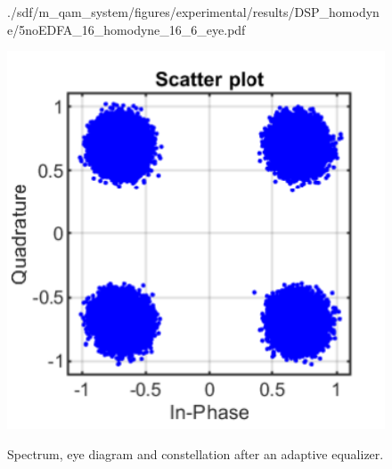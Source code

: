 \begin{figure}[H]
\begin{minipage}{0.30\textwidth}
			{./sdf/m_qam_system/figures/experimental/results/DSP_homodyne/5noEDFA_16_homodyne_16_6_eye.pdf}
			\label{fig:16GBdSpecMF}
		\end{minipage}
		\begin{minipage}{0.30\textwidth}
			\centering
			\includegraphics[width=1\textwidth]
			{./sdf/m_qam_system/figures/experimental/results/DSP_homodyne/5noEDFA_16_homodyne_16_6_const.pdf}\\
			\label{fig:16GBdSpecBefFec}
		\end{minipage}
		\caption{Spectrum, eye diagram and constellation after an adaptive equalizer.}
		\label{fig:16GBdFinalHm}
	\end{figure}


